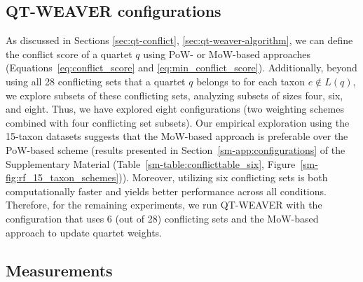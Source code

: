 \documentclass[10pt,a4paper]{article}
\begin{document}
 

 
\subsection{QT-WEAVER configurations}
\label{sec:qt-weaver-configuration}

As discussed in Sections \ref{sec:qt-conflict}, \ref{sec:qt-weaver-algorithm}, we can define the conflict score of a quartet $q$ using PoW- or MoW-based approaches (Equations~\ref{eq:conflict_score} and \ref{eq:min_conflict_score}). %
Additionally, beyond using all 28 conflicting sets that a quartet $q$ belongs to for each taxon $e \notin L(q)$, we explore subsets of these conflicting sets, analyzing subsets of sizes four, six, and eight. Thus, we have explored eight configurations (two weighting schemes combined with four conflicting set subsets). Our empirical exploration using the 15-taxon datasets suggests that the MoW-based approach is preferable over the PoW-based scheme (results presented in Section~\ref{sm-app:configurations} of the Supplementary Material (Table~\ref{sm-table:conflicttable_six}, Figure~\ref{sm-fig:rf_15_taxon_schemes})). Moreover, utilizing six conflicting sets is both computationally faster and yields better performance across all conditions. Therefore, for the remaining experiments, we run QT-WEAVER with the configuration that uses 6 (out of 28) conflicting sets and the MoW-based approach to update quartet weights.

\subsection{Measurements}
\end{document}
